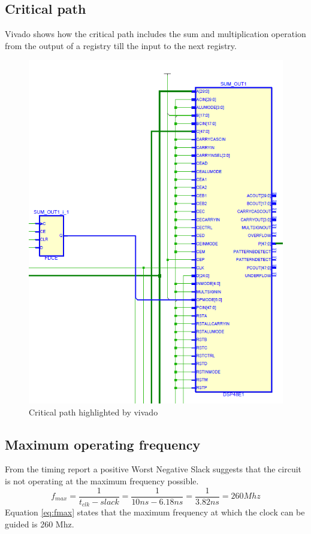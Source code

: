 \subsection{Critical path} %
\label{sub:critical_path}
Vivado shows how the critical path includes the sum and multiplication operation from the output of a registry till the input to the next registry.
 \begin{figure}[H]
   \centering
   \includegraphics[width=0.9\linewidth]{./images/critical}
   \caption{Critical path highlighted by vivado}
   \label{fig:critical}
 \end{figure}
\subsection{Maximum operating frequency} %
\label{sub:maximum_operating_frequency}
From the timing report a positive Worst Negative Slack suggests that the circuit is not operating at the maximum frequency possible.
\begin{equation}
	f_{max} = \frac{1}{t_{clk}-slack}=\frac{1}{10ns-6.18ns}= \frac{1}{3.82ns}= 260 Mhz
	\label{eq:fmax}
\end{equation}
Equation \ref{eq:fmax} states that the maximum frequency at which the clock can be guided is 260 Mhz.

